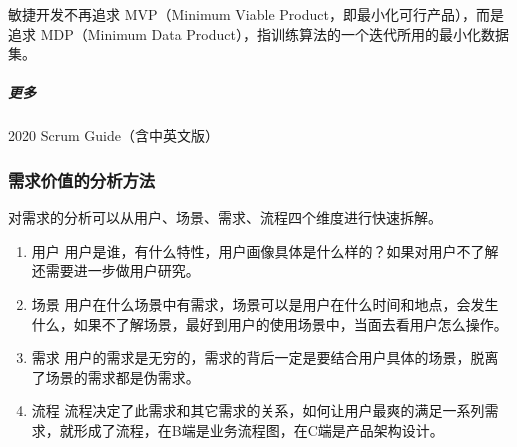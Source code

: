 \documentclass[letterpaper,10pt,english]{sphinxmanual}
\begin{document}
敏捷开发不再追求 MVP（Minimum Viable
Product，即最小化可行产品），而是追求 MDP（Minimum Data
Product），指训练算法的一个迭代所用的最小化数据集。
%
\begin{footnote}[821]\sphinxAtStartFootnote
{}
%
\end{footnote}


\subparagraph{更多}
\label{\detokenize{chapter_project/Scrum:id21}}
2020 Scrum
Guide（含中英文版）%
\begin{footnote}[822]\sphinxAtStartFootnote
{}
%
\end{footnote}

%
\begin{footnote}[823]\sphinxAtStartFootnote
{}
%
\end{footnote}


\subsubsection{需求价值的分析方法}
\label{\detokenize{chapter_project/separate_need:id1}}\label{\detokenize{chapter_project/separate_need::doc}}
对需求的分析可以从用户、场景、需求、流程四个维度进行快速拆解。
\begin{enumerate}
%
\item {} 
用户
用户是谁，有什么特性，用户画像具体是什么样的？如果对用户不了解还需要进一步做用户研究。

\item {} 
场景
用户在什么场景中有需求，场景可以是用户在什么时间和地点，会发生什么，如果不了解场景，最好到用户的使用场景中，当面去看用户怎么操作。

\item {} 
需求
用户的需求是无穷的，需求的背后一定是要结合用户具体的场景，脱离了场景的需求都是伪需求。

\item {} 
流程
流程决定了此需求和其它需求的关系，如何让用户最爽的满足一系列需求，就形成了流程，在B端是业务流程图，在C端是产品架构设计。

\end{enumerate}
\end{document}
